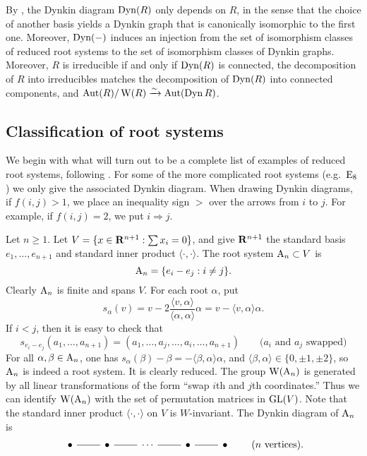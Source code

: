 By \cite[VI \S 4.2]{bourbaki-lie-alg-4-6}, the Dynkin diagram $\operatorname{Dyn}(R)$ 
only depends on $R$, in the sense that the choice of another basis yields a 
Dynkin graph that is canonically isomorphic to the first one. Moreover, 
$\operatorname{Dyn}(-)$ induces an injection from the set of isomorphism classes of 
reduced root systems to the set of isomorphism classes of Dynkin graphs. 
Moreover, $R$ is irreducible if and only if $\operatorname{Dyn}(R)$ is connected, the 
decomposition of $R$ into irreducibles matches the decomposition of 
$\operatorname{Dyn}(R)$ into connected components, and 
$\operatorname{Aut}(R)/\operatorname{W}(R)\xrightarrow\sim \operatorname{Aut}(\operatorname{Dyn} R)$. 





\subsection{Classification of root systems}

We begin with what will turn out to be a complete list of examples of reduced 
root systems, following \cite[VI \S4]{bourbaki-lie-alg-4-6}. For some of the 
more complicated root systems (e.g.~$\mathrm{E}_8$) we only give the associated 
Dynkin diagram. When drawing Dynkin diagrams, if $f(i,j)>1$, we place an 
inequality sign $>$ over the arrows from $i$ to $j$. For example, if 
$f(i,j)=2$, we put $i\Rightarrow j$. 


\begin{example}
Let $n\geqslant 1$. Let $V=\{x\in \mathbf{R}^{n+1}:\sum x_i=0\}$, and give $\mathbf{R}^{n+1}$ 
the standard basis $e_1,\dots,e_{n+1}$ and standard inner product 
$\langle\cdot,\cdot\rangle$. The root system $\mathrm{A}_n\subset V$ is 
\[
  \mathrm{A}_n=\{e_i-e_j:i\ne j\} .
\]
Clearly $\mathrm{A}_n$ is finite and spans $V$. For each root $\alpha$, put 
\[
  s_\alpha(v) = v-2\frac{\langle v,\alpha\rangle}{\langle \alpha,\alpha\rangle} \alpha  = v-\langle v,\alpha\rangle \alpha .
\]
If $i<j$, then it is easy to check that 
\[
  s_{e_i-e_j}(a_1,\dots,a_{n+1}) = (a_1,\dots,a_j,\dots,a_i,\dots,a_{n+1}) \qquad \text{($a_i$ and $a_j$ swapped)}
\]
For all $\alpha,\beta\in \mathrm{A}_n$, one has 
$s_\alpha(\beta)-\beta=-\langle \beta,\alpha\rangle\alpha$, and 
$\langle \beta,\alpha\rangle\in \{0,\pm 1,\pm 2\}$, so $\mathrm{A}_n$ is indeed 
a root system. It is clearly reduced. The group $\operatorname{W}(\mathrm{A}_n)$ is generated 
by all linear transformations of the form ``swap $i$th and $j$th coordinates.'' 
Thus we can identify $\operatorname{W}(\mathrm{A}_n)$ with the set of permutation matrices 
in $\operatorname{GL}(V)$. Note that the standard inner product $\langle\cdot,\cdot\rangle$ 
on $V$ is $W$-invariant. The Dynkin diagram of $\mathrm{A}_n$ is 
\[
\begin{tikzcd}
  \bullet \ar[r, dash] 
    & \bullet \ar[r, dash] 
    & \cdots \ar[r, dash] 
    & \bullet \ar[r, dash] 
    & \bullet
\end{tikzcd}
\qquad\text{($n$ vertices)} .
\]
\end{example}

